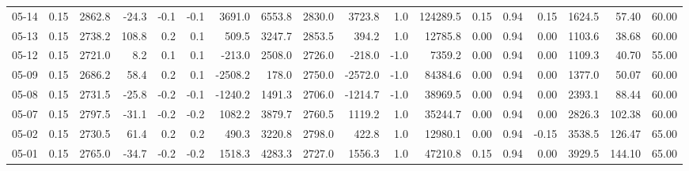 \begin{threeparttable}
{\begin{tabular}{lrrrrrrrrrrrrrrrrr}
  05-14 &     0.15 & 2862.8 &             -24.3 &              -0.1 &               -0.1 &             3691.0 &  6553.8 & 2830.0 &     3723.8 &                      1.0 &            124289.5 &       0.15 &      0.94 &           0.15 &           1624.5 &           57.40 &                  60.00 \\
  05-13 &     0.15 & 2738.2 &             108.8 &               0.2 &                0.1 &              509.5 &  3247.7 & 2853.5 &      394.2 &                      1.0 &             12785.8 &       0.00 &      0.94 &           0.00 &           1103.6 &           38.68 &                  60.00 \\
  05-12 &     0.15 & 2721.0 &               8.2 &               0.1 &                0.1 &             -213.0 &  2508.0 & 2726.0 &     -218.0 &                     -1.0 &              7359.2 &       0.00 &      0.94 &           0.00 &           1109.3 &           40.70 &                  55.00 \\
  05-09 &     0.15 & 2686.2 &              58.4 &               0.2 &                0.1 &            -2508.2 &   178.0 & 2750.0 &    -2572.0 &                     -1.0 &             84384.6 &       0.00 &      0.94 &           0.00 &           1377.0 &           50.07 &                  60.00 \\
  05-08 &     0.15 & 2731.5 &             -25.8 &              -0.2 &               -0.1 &            -1240.2 &  1491.3 & 2706.0 &    -1214.7 &                     -1.0 &             38969.5 &       0.00 &      0.94 &           0.00 &           2393.1 &           88.44 &                  60.00 \\
  05-07 &     0.15 & 2797.5 &             -31.1 &              -0.2 &               -0.2 &             1082.2 &  3879.7 & 2760.5 &     1119.2 &                      1.0 &             35244.7 &       0.00 &      0.94 &           0.00 &           2826.3 &          102.38 &                  60.00 \\
  05-02 &     0.15 & 2730.5 &              61.4 &               0.2 &                0.2 &              490.3 &  3220.8 & 2798.0 &      422.8 &                      1.0 &             12980.1 &       0.00 &      0.94 &          -0.15 &           3538.5 &          126.47 &                  65.00 \\
  05-01 &     0.15 & 2765.0 &             -34.7 &              -0.2 &               -0.2 &             1518.3 &  4283.3 & 2727.0 &     1556.3 &                      1.0 &             47210.8 &       0.15 &      0.94 &           0.00 &           3929.5 &          144.10 &                  65.00 \\

\end{tabular}}
\end{threeparttable}
